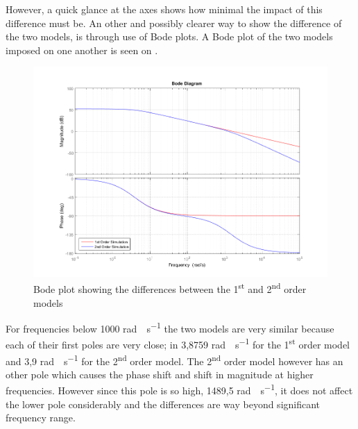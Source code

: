 However, a quick glance at the axes shows how minimal the impact of this difference must be. An other and possibly clearer way to show the difference of the two models, is through use of Bode plots. A Bode plot of the two models imposed on one another is seen on .
%
\begin{figure}[H]
	\centering
	\includegraphics[width=1.1 \textwidth]{figures/bodePlotOf1stAnd2ndOrderModel.png}
	\caption{Bode plot showing the differences between the \si{1^{st}} and \si{2^{nd}} order models}
	\label{fig:bodePlotOf1stAnd2ndOrderModel}
\end{figure}
%
For frequencies below 1000 \si{rad\cdot s^{-1}} the two models are very similar because each of their first poles are very close; in 3,8759 \si{rad\cdot s^{-1}} for the \si{1^{st}} order model and 3,9 \si{rad\cdot s^{-1}} for the \si{2^{nd}} order model. The \si{2^{nd}} order model however has an other pole which causes the phase shift and shift in magnitude at higher frequencies. However since this pole is so high, 1489,5 \si{rad\cdot s^{-1}}, it does not affect the lower pole considerably and the differences are way beyond significant frequency range.

